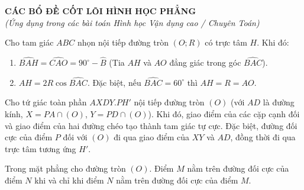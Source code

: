 \documentclass[12pt,a4paper]{article}
\begin{document}
\begin{center}
	{\Large \textbf{CÁC BỔ ĐỀ CỐT LÕI HÌNH HỌC PHẲNG}}\\[2mm]
	{\small \textit{(Ứng dụng trong các bài toán Hình học Vận dụng cao / Chuyên Toán)}}
\end{center}
\vspace{4mm}

\begin{tcolorbox}[colback=blue!5!white,colframe=blue!75!black,title=\textbf{Bổ đề 1: Hệ thức khoảng cách Trực tâm và Cặp tia đẳng giác}]
Cho tam giác $ABC$ nhọn nội tiếp đường tròn $(O; R)$ có trực tâm $H$. Khi đó:
\begin{enumerate}
    \item $\widehat{BAH} = \widehat{CAO} = 90^\circ - \widehat{B}$ (Tia $AH$ và $AO$ đẳng giác trong góc $\widehat{BAC}$).
    \item $AH = 2R \cos \widehat{BAC}$. Đặc biệt, nếu $\widehat{BAC} = 60^\circ$ thì $AH = R = AO$.
\end{enumerate}
\end{tcolorbox}

\vspace{2mm}

\begin{tcolorbox}[colback=teal!5!white,colframe=teal!75!black,title=\textbf{Bổ đề 2: Đường đối cực của một điểm đối với đường tròn qua Tứ giác toàn phần}]
Cho tứ giác toàn phần $AXDY.PH'$ nội tiếp đường tròn $(O)$ (với $AD$ là đường kính, $X = PA \cap (O)$, $Y = PD \cap (O)$). Khi đó, giao điểm của các cặp cạnh đối và giao điểm của hai đường chéo tạo thành tam giác tự cực. Đặc biệt, đường đối cực của điểm $P$ đối với $(O)$ đi qua giao điểm của $XY$ và $AD$, đồng thời đi qua trực tâm tương ứng $H'$.
\end{tcolorbox}

\vspace{2mm}

\begin{tcolorbox}[colback=orange!5!white,colframe=orange!75!black,title=\textbf{Bổ đề 3: Định lý La Hire}]
Trong mặt phẳng cho đường tròn $(O)$. Điểm $M$ nằm trên đường đối cực của điểm $N$ khi và chỉ khi điểm $N$ nằm trên đường đối cực của điểm $M$.
\end{tcolorbox}
\end{document}
